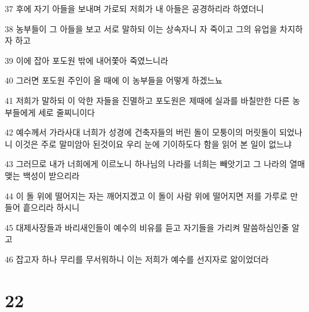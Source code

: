 \par 37 후에 자기 아들을 보내며 가로되 저희가 내 아들은 공경하리라 하였더니
\par 38 농부들이 그 아들을 보고 서로 말하되 이는 상속자니 자 죽이고 그의 유업을 차지하자 하고
\par 39 이에 잡아 포도원 밖에 내어쫓아 죽였느니라
\par 40 그러면 포도원 주인이 올 때에 이 농부들을 어떻게 하겠느뇨
\par 41 저희가 말하되 이 악한 자들을 진멸하고 포도원은 제때에 실과를 바칠만한 다른 농부들에게 세로 줄찌니이다
\par 42 예수께서 가라사대 너희가 성경에 건축자들의 버린 돌이 모퉁이의 머릿돌이 되었나니 이것은 주로 말미암아 된것이요 우리 눈에 기이하도다 함을 읽어 본 일이 없느냐
\par 43 그러므로 내가 너희에게 이르노니 하나님의 나라를 너희는 빼앗기고 그 나라의 열매 맺는 백성이 받으리라
\par 44 이 돌 위에 떨어지는 자는 깨어지겠고 이 돌이 사람 위에 떨어지면 저를 가루로 만들어 흩으리라 하시니
\par 45 대제사장들과 바리새인들이 예수의 비유를 듣고 자기들을 가리켜 말씀하심인줄 알고
\par 46 잡고자 하나 무리를 무서워하니 이는 저희가 예수를 선지자로 앎이었더라

\chapter{22}

